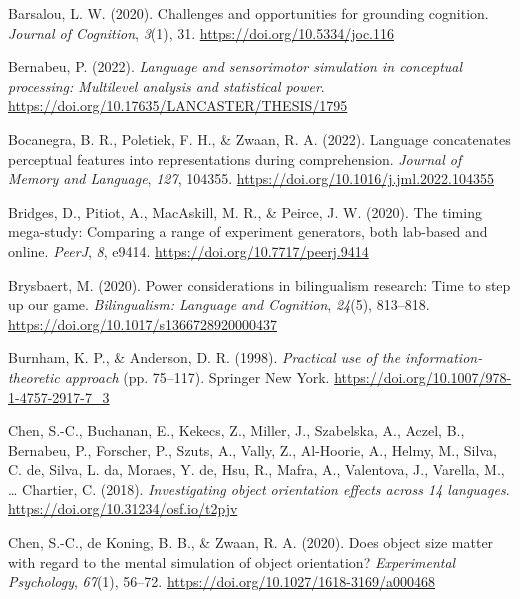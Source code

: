 \documentclass[
  man,mask,floatsintext]{apa7}
\newlength{\cslhangindent}
\newlength{\cslentryspacingunit} %
\newenvironment{CSLReferences}[2] %
 {%
  \setlength{\parindent}{0pt}
  \ifodd #1
  \let\oldpar\par
  \def\par{\hangindent=\cslhangindent\oldpar}
  \fi
  \setlength{\parskip}{#2\cslentryspacingunit}
 }%
 {}
\begin{document}
\begin{CSLReferences}{1}{0}
\leavevmode{}%
Barsalou, L. W. (2020). Challenges and opportunities for grounding cognition. \emph{Journal of Cognition}, \emph{3}(1), 31. \url{https://doi.org/10.5334/joc.116}

\leavevmode{}%
Bernabeu, P. (2022). \emph{Language and sensorimotor simulation in conceptual processing: Multilevel analysis and statistical power}. \url{https://doi.org/10.17635/LANCASTER/THESIS/1795}

\leavevmode{}%
Bocanegra, B. R., Poletiek, F. H., \& Zwaan, R. A. (2022). Language concatenates perceptual features into representations during comprehension. \emph{Journal of Memory and Language}, \emph{127}, 104355. \url{https://doi.org/10.1016/j.jml.2022.104355}

\leavevmode{}%
Bridges, D., Pitiot, A., MacAskill, M. R., \& Peirce, J. W. (2020). The timing mega-study: Comparing a range of experiment generators, both lab-based and online. \emph{PeerJ}, \emph{8}, e9414. \url{https://doi.org/10.7717/peerj.9414}

\leavevmode{}%
Brysbaert, M. (2020). Power considerations in bilingualism research: Time to step up our game. \emph{Bilingualism: Language and Cognition}, \emph{24}(5), 813--818. \url{https://doi.org/10.1017/s1366728920000437}

\leavevmode{}%
Burnham, K. P., \& Anderson, D. R. (1998). \emph{Practical use of the information-theoretic approach} (pp. 75--117). Springer New York. \url{https://doi.org/10.1007/978-1-4757-2917-7_3}

\leavevmode{}%
Chen, S.-C., Buchanan, E., Kekecs, Z., Miller, J., Szabelska, A., Aczel, B., Bernabeu, P., Forscher, P., Szuts, A., Vally, Z., Al-Hoorie, A., Helmy, M., Silva, C. de, Silva, L. da, Moraes, Y. de, Hsu, R., Mafra, A., Valentova, J., Varella, M., \ldots{} Chartier, C. (2018). \emph{Investigating object orientation effects across 14 languages}. \url{https://doi.org/10.31234/osf.io/t2pjv}

\leavevmode{}%
Chen, S.-C., de Koning, B. B., \& Zwaan, R. A. (2020). Does object size matter with regard to the mental simulation of object orientation? \emph{Experimental Psychology}, \emph{67}(1), 56--72. \url{https://doi.org/10.1027/1618-3169/a000468}


\end{CSLReferences}
\end{document}
